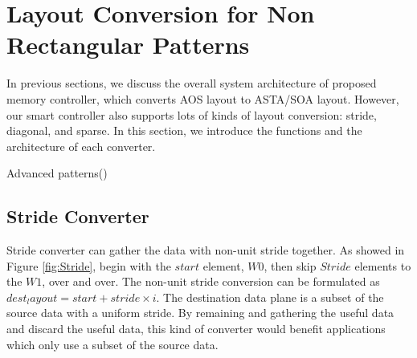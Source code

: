 \documentclass[10pt,journal,compsoc]{IEEEtran}
\begin{document}
\section{Layout Conversion for Non Rectangular Patterns}\label{Special patterns}
In previous sections, we discuss the overall system architecture of proposed memory controller, which converts AOS layout to ASTA/SOA layout. However, our smart controller also supports lots of kinds of layout conversion: stride, diagonal, and sparse. In this section, we introduce the functions and the architecture of each converter.


\begin{algorithm} [h]
\KwIn{
Parameters from memcpySC API}
\KwResult{
Transformed data layout stores in the destination memory}
\caption{Advanced patterns()}
\label{alg:Advanced}
\end{algorithm}






\subsection{Stride Converter} \label{Stride}
Stride converter can gather the data with non-unit stride together. As showed in Figure \ref{fig:Stride}, begin with the $  start $ element, $ W0 $, then skip $ Stride $ elements to the  $ W1 $, over and over. The non-unit stride conversion can be formulated as $dest_layout=start+ stride \times i$. The destination data plane is a subset of the source data with a uniform stride. By remaining and gathering the useful data and discard the useful data, this kind of converter would benefit applications which only use a subset of the source data.
\end{document}
